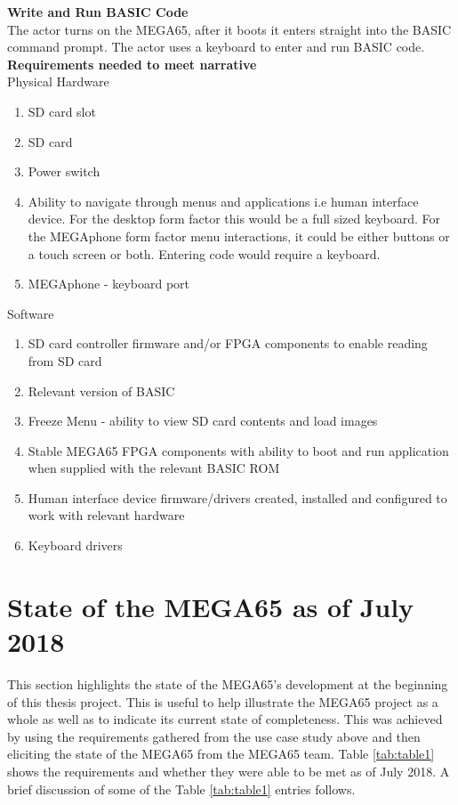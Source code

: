 \textbf{Write and Run BASIC Code}\\
The actor turns on the MEGA65, after it boots it enters straight into the BASIC command prompt. The actor uses a keyboard to enter and run BASIC code. \\

\textbf{Requirements needed to meet narrative}\\
Physical Hardware
\begin{enumerate}
\item SD card slot
\item SD card
\item Power switch
\item Ability to navigate through menus and applications i.e human interface device. For the desktop form factor this would be a full sized keyboard. For the MEGAphone form factor menu interactions, it could be either buttons or a touch screen or both. Entering code would require a keyboard.
\item MEGAphone - keyboard port
\end{enumerate}

Software\\
\begin{enumerate}
\item SD card controller firmware and/or FPGA components to enable reading from SD card
\item Relevant version of BASIC 
\item Freeze Menu - ability to view SD card contents and load images
\item Stable MEGA65 FPGA components with ability to boot and run application when supplied with the relevant BASIC ROM
\item Human interface device firmware/drivers created, installed and configured to work with relevant hardware
\item Keyboard drivers
\end{enumerate}

\section{State of the MEGA65 as of July 2018}
This section highlights the state of the MEGA65's development at the beginning of this thesis project. This is useful to help illustrate the MEGA65 project as a whole as well as to indicate its current state of completeness. This was achieved by using the requirements gathered from the use case study above and then eliciting the state of the MEGA65 from the MEGA65 team. Table \ref{tab:table1} shows the requirements and whether they were able to be met as of July 2018. A brief discussion of some of the Table \ref{tab:table1} entries follows. 

